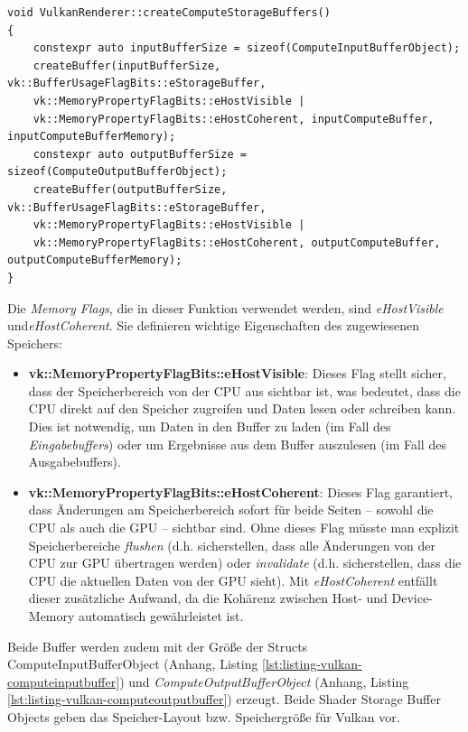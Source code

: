 \documentclass[11pt]{scrartcl}
\begin{document}
	\begin{lstlisting}[caption={Erstellen der Shader Storage Buffer Objects in VulkanRenderer.cpp},label={lst:listing-vulkan-computestoragebufferscpp}]
void VulkanRenderer::createComputeStorageBuffers()
{
	constexpr auto inputBufferSize = sizeof(ComputeInputBufferObject);
	createBuffer(inputBufferSize, vk::BufferUsageFlagBits::eStorageBuffer,
	vk::MemoryPropertyFlagBits::eHostVisible |
	vk::MemoryPropertyFlagBits::eHostCoherent, inputComputeBuffer, inputComputeBufferMemory);
	constexpr auto outputBufferSize = sizeof(ComputeOutputBufferObject);
	createBuffer(outputBufferSize, vk::BufferUsageFlagBits::eStorageBuffer,
	vk::MemoryPropertyFlagBits::eHostVisible |
	vk::MemoryPropertyFlagBits::eHostCoherent, outputComputeBuffer, outputComputeBufferMemory);
}	\end{lstlisting}
	
	Die \textit{Memory Flags}, die in dieser Funktion verwendet werden, sind \textit{eHostVisible} und\textit{eHostCoherent}. Sie definieren wichtige Eigenschaften des zugewiesenen Speichers:
	\begin{itemize}
		\item \textbf{vk::MemoryPropertyFlagBits::eHostVisible}: Dieses Flag stellt sicher, dass der Speicherbereich von der CPU aus sichtbar ist, was bedeutet, dass die CPU direkt auf den Speicher zugreifen und Daten lesen oder schreiben kann. Dies ist notwendig, um Daten in den Buffer zu laden (im Fall des \textit{Eingabebuffers}) oder um Ergebnisse aus dem Buffer auszulesen (im Fall des Ausgabebuffers).\cite{VulkanMemoryFlags}
		\item \textbf{vk::MemoryPropertyFlagBits::eHostCoherent}: Dieses Flag garantiert, dass Änderungen am Speicherbereich sofort für beide Seiten – sowohl die CPU als auch die GPU – sichtbar sind. Ohne dieses Flag müsste man explizit Speicherbereiche \textit{flushen} (d.h. sicherstellen, dass alle Änderungen von der CPU zur GPU übertragen werden) oder \textit{invalidate} (d.h. sicherstellen, dass die CPU die aktuellen Daten von der GPU sieht). Mit \textit{eHostCoherent} entfällt dieser zusätzliche Aufwand, da die Kohärenz zwischen Host- und Device-Memory automatisch gewährleistet ist.\cite{VulkanMemoryFlags}
	\end{itemize}

	Beide Buffer werden zudem mit der Größe der Structs ComputeInputBufferObject (Anhang, Listing \ref{lst:listing-vulkan-computeinputbuffer}) und \textit{ComputeOutputBufferObject} (Anhang, Listing \ref{lst:listing-vulkan-computeoutputbuffer}) erzeugt. Beide Shader Storage Buffer Objects geben das Speicher-Layout bzw. Speichergröße für Vulkan vor.
	
\end{document}
